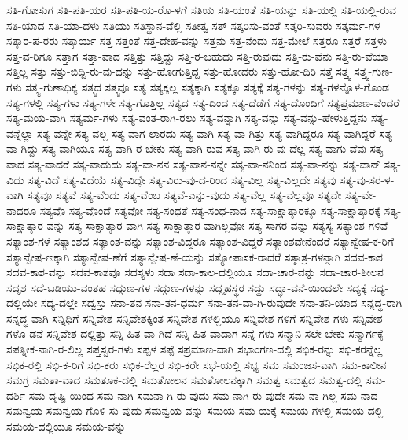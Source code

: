 {ಸತಿ-ಗೋಸುಗ
ಸತಿ-ಪತಿ-ಯರ
ಸತಿ-ಪತಿ-ಯ-ರೊ-ಳಗೆ
ಸತಿಯ
ಸತಿ-ಯಂತೆ
ಸತಿ-ಯನ್ನು
ಸತಿ-ಯಲ್ಲಿ
ಸತಿ-ಯಲ್ಲಿ-ರುವ
ಸತಿ-ಯಾದ
ಸತಿ-ಯಾ-ದಳು
ಸತಿಯು
ಸತಿಸ್ಥಾನ-ವೆಲ್ಲಿ
ಸತೀತ್ವ
ಸತ್
ಸತ್ಕರಿಸು-ವಂತೆ
ಸತ್ಕರಿ-ಸುವರು
ಸತ್ಕರ್ಮ-ಗಳ
ಸತ್ಕಾರ-ಪ-ರರು
ಸತ್ಕಾರ್ಯ
ಸತ್ತ
ಸತ್ತಂತೆ
ಸತ್ತ-ದೇಹ-ವನ್ನು
ಸತ್ತನು
ಸತ್ತ-ನೆಂದು
ಸತ್ತ-ಮೇಲೆ
ಸತ್ತರೂ
ಸತ್ತರೆ
ಸತ್ತಳು
ಸತ್ತ-ವ-ರಿಗೂ
ಸತ್ತಾಗ
ಸತ್ತಾ-ವಾದ
ಸತ್ತಿತ್ತು
ಸತ್ತಿದ್ದು
ಸತ್ತಿ-ರ-ಬಹುದು
ಸತ್ತಿ-ರುವುದು
ಸತ್ತಿ-ರು-ವೆನು
ಸತ್ತಿ-ರು-ವೆಯಾ
ಸತ್ತಿಲ್ಲ
ಸತ್ತು
ಸತ್ತು-ಬಿದ್ದಿ-ರು-ವು-ದನ್ನು
ಸತ್ತು-ಹೋಗುತ್ತಿದ್ದ
ಸತ್ತು-ಹೋದರು
ಸತ್ತು-ಹೋ-ದಿರಿ
ಸತ್ತೆ
ಸತ್ತ್ವ
ಸತ್ತ್ವ-ಗುಣ-ಗಳು
ಸತ್ತ್ವ-ಗುಣಾಧಿಕ್ಯ
ಸತ್ತ್ವದ
ಸತ್ತ್ವವೂ
ಸತ್ಯ
ಸತ್ಯಕ್ಕಲ್ಲ
ಸತ್ಯಕ್ಕಾಗಿ
ಸತ್ಯಕ್ಕೂ
ಸತ್ಯಕ್ಕೆ
ಸತ್ಯ-ಗಳನ್ನು
ಸತ್ಯ-ಗಳನ್ನೊಳ-ಗೊಂಡ
ಸತ್ಯ-ಗಳಲ್ಲಿ
ಸತ್ಯ-ಗಳು
ಸತ್ಯ-ಗಳೇ
ಸತ್ಯ-ಗೊತ್ತಿಲ್ಲ
ಸತ್ಯದ
ಸತ್ಯ-ದಿಂದ
ಸತ್ಯ-ದೆಡೆಗೆ
ಸತ್ಯ-ದೊಂದಿಗೆ
ಸತ್ಯಪ್ರಮಾಣ-ವೆಂದರೆ
ಸತ್ಯ-ಮಯ-ವಾಗಿ
ಸತ್ಯರ್ಮ-ಗಳು
ಸತ್ಯ-ವಂತ-ರಾಗಿ-ರಲು
ಸತ್ಯ-ವನ್ನಾಗಿ
ಸತ್ಯ-ವನ್ನು
ಸತ್ಯ-ವನ್ನು-ಹೇಳುತ್ತಿದ್ದನು
ಸತ್ಯ-ವನ್ನೆಲ್ಲಾ
ಸತ್ಯ-ವನ್ನೇ
ಸತ್ಯ-ವಲ್ಲ
ಸತ್ಯ-ವಾಗ-ಲಾರದು
ಸತ್ಯ-ವಾಗಿ
ಸತ್ಯ-ವಾ-ಗಿತ್ತು
ಸತ್ಯ-ವಾಗಿದ್ದರೂ
ಸತ್ಯ-ವಾಗಿದ್ದರೆ
ಸತ್ಯ-ವಾ-ಗಿದ್ದು
ಸತ್ಯ-ವಾಗಿಯೂ
ಸತ್ಯ-ವಾಗಿ-ರ-ಬೇಕು
ಸತ್ಯ-ವಾಗಿ-ರುವ
ಸತ್ಯ-ವಾಗಿ-ರು-ವು-ದೆಲ್ಲ
ಸತ್ಯ-ವಾಗು-ವೆವು
ಸತ್ಯ-ವಾದ
ಸತ್ಯ-ವಾದರೆ
ಸತ್ಯ-ವಾದುದು
ಸತ್ಯ-ವಾ-ನನ
ಸತ್ಯ-ವಾನ-ನನ್ನೇ
ಸತ್ಯ-ವಾ-ನನಿಂದ
ಸತ್ಯ-ವಾ-ನನ್ನು
ಸತ್ಯ-ವಾನ್
ಸತ್ಯ-ವಿದು
ಸತ್ಯ-ವಿದೆ
ಸತ್ಯ-ವಿದೆಯೆ
ಸತ್ಯ-ವಿದ್ದೇ
ಸತ್ಯ-ವಿರು-ವು-ದ-ರಿಂದ
ಸತ್ಯ-ವಿಲ್ಲ
ಸತ್ಯ-ವಿಲ್ಲದೇ
ಸತ್ಯವು
ಸತ್ಯ-ವು-ಸರ-ಳ-ವಾಗಿ
ಸತ್ಯವೂ
ಸತ್ಯವೆ
ಸತ್ಯ-ವೆಂದು
ಸತ್ಯ-ವೆಂಬ
ಸತ್ಯವೆ-ಎನ್ನು-ವುದು
ಸತ್ಯ-ವೆಲ್ಲ
ಸತ್ಯ-ವೆಲ್ಲವೂ
ಸತ್ಯವೇ
ಸತ್ಯ-ವೇ-ನಾದರೂ
ಸತ್ಯವೊ
ಸತ್ಯ-ವೊಂದೆ
ಸತ್ಯವೋ
ಸತ್ಯ-ಸಂಧತೆ
ಸತ್ಯ-ಸಂಧ-ನಾದ
ಸತ್ಯ-ಸಾಕ್ಷಾತ್ಕಾರಕ್ಕೂ
ಸತ್ಯ-ಸಾಕ್ಷಾತ್ಕಾರಕ್ಕೆ
ಸತ್ಯ-ಸಾಕ್ಷಾತ್ಕಾರ-ವನ್ನು
ಸತ್ಯ-ಸಾಕ್ಷಾತ್ಕಾರ-ವಾಗಿ
ಸತ್ಯ-ಸಾಕ್ಷಾತ್ಕಾರ-ವಾಗಿಲ್ಲವೋ
ಸತ್ಯ-ಸಾಗರ-ವನ್ನು
ಸತ್ಯಸ್ಯ
ಸತ್ಯಾಂಶ-ಗಳಿವೆ
ಸತ್ಯಾಂಶ-ಗಳೆ
ಸತ್ಯಾಂಶದ
ಸತ್ಯಾಂಶ-ವನ್ನು
ಸತ್ಯಾಂಶ-ವಿದ್ದರೂ
ಸತ್ಯಾಂಶ-ವಿದ್ದರೆ
ಸತ್ಯಾಂಶವೇನೆಂದರೆ
ಸತ್ಯಾನ್ವೇಷ-ಕ-ರಿಗೆ
ಸತ್ಯಾನ್ವೇಷ-ಣಕ್ಕಾಗಿ
ಸತ್ಯಾನ್ವೇಷ-ಣೆಗೆ
ಸತ್ಯಾನ್ವೇಷ-ಣೆ-ಯನ್ನು
ಸತ್ಯೋಪಾಸಕ-ರಾದರೆ
ಸತ್ಶಾತ್ರ-ಗಳನ್ನಾಗಿ
ಸದವ-ಕಾಶ
ಸದವ-ಕಾಶ-ವನ್ನು
ಸದವ-ಕಾಶವೂ
ಸದಸ್ಯಳು
ಸದಾ
ಸದಾ-ಕಾಲ-ದಲ್ಲಿಯೂ
ಸದಾ-ಚಾರ-ವನ್ನು
ಸದಾ-ಚಾರ-ಶೀಲನ
ಸದೃಶ
ಸದೆ-ಬಡಿಯು-ವಂತಹ
ಸದ್ಗುಣ-ಗಳ
ಸದ್ಗುಣ-ಗಳನ್ನು
ಸದ್ಗೃಹಸ್ಥರ
ಸದ್ದು
ಸದ್ಭಾ-ವನೆ-ಯಿಂದಲೇ
ಸದ್ಯಕ್ಕೆ
ಸದ್ಯ-ದಲ್ಲಿಯೇ
ಸದ್ಯ-ದಲ್ಲೇ
ಸದ್ವಸ್ತು
ಸನಾ-ತನ
ಸನಾ-ತನ-ಧರ್ಮ
ಸನಾ-ತನ-ವಾ-ಗಿ-ರುವುದೇ
ಸನಾ-ತನಿ-ಯಾದ
ಸನ್ನದ್ಧ-ರಾಗಿ
ಸನ್ನದ್ಧ-ವಾಗಿ
ಸನ್ನಿಧಿಗೆ
ಸನ್ನಿವೇಶ
ಸನ್ನಿವೇಶಕ್ಕಿಂತ
ಸನ್ನಿವೇಶ-ಗಳಲ್ಲಿಯೂ
ಸನ್ನಿವೇಶ-ಗಳಿಗೆ
ಸನ್ನಿವೇಶ-ಗಳು
ಸನ್ನಿವೇಶ-ಗಳೊ-ಡನೆ
ಸನ್ನಿವೇಶ-ದಲ್ಲಿತ್ತು
ಸನ್ನಿ-ಹಿತ-ವಾ-ಗಿದೆ
ಸನ್ನಿ-ಹಿತ-ವಾದಾಗ
ಸನ್ನೆ-ಗಳು
ಸನ್ಮಾನಿ-ಸಲೇ-ಬೇಕು
ಸನ್ಮಾರ್ಗಕ್ಕೆ
ಸಪತ್ನೀಕ-ನಾಗಿ-ರ-ಲಿಲ್ಲ
ಸಪ್ತಸ್ವರ-ಗಳು
ಸಪ್ಪಳ
ಸಪ್ಪೆ
ಸಪ್ರಮಾಣ-ವಾಗಿ
ಸಭಾಂಗಣ-ದಲ್ಲಿ
ಸಭಿಕ-ರನ್ನು
ಸಭಿ-ಕರನ್ನೆಲ್ಲ
ಸಭಿಕ-ರಲ್ಲಿ
ಸಭಿ-ಕ-ರಿಗೆ
ಸಭಿ-ಕರು
ಸಭಿಕ-ರೆಲ್ಲರ
ಸಭಿ-ಕರೇ
ಸಭೆ-ಯಲ್ಲಿ
ಸಭ್ಯ
ಸಮ
ಸಮಂಜಸ-ವಾಗಿ
ಸಮ-ಕಾಲೀನ
ಸಮಗ್ರ
ಸಮತಾ-ವಾದ
ಸಮತೂಕ-ದಲ್ಲಿ
ಸಮತೋಲನ
ಸಮತೋಲನಕ್ಕಾಗಿ
ಸಮತ್ವ
ಸಮತ್ವದ
ಸಮತ್ವ-ದಲ್ಲಿ
ಸಮ-ದರ್ಶಿ
ಸಮ-ದೃಷ್ಟಿ-ಯಿಂದ
ಸಮ-ನಾಗಿ
ಸಮನಾ-ಗಿ-ರು-ವುದು
ಸಮ-ನಾಗಿ-ರು-ವುದೇ
ಸಮ-ನಾ-ಗಿಲ್ಲ
ಸಮ-ನಾದ
ಸಮನ್ವಯ
ಸಮನ್ವಯ-ಗೊಳಿ-ಸು-ವುದು
ಸಮನ್ವಯ-ವನ್ನು
ಸಮಯ
ಸಮ-ಯಕ್ಕೆ
ಸಮಯ-ಗಳಲ್ಲಿ
ಸಮಯ-ದಲ್ಲಿ
ಸಮಯ-ದಲ್ಲಿಯೂ
ಸಮಯ-ವನ್ನು
}

